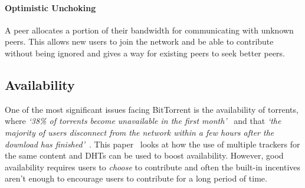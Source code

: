 \paragraph*{Optimistic Unchoking}
A peer allocates a portion of their bandwidth for communicating with unknown peers. This allows new users to join the network and be able to contribute without being ignored and gives a way for existing peers to seek better peers.

\subsection*{Availability}\label{subsec:availability}

One of the most significant issues facing BitTorrent is the availability of torrents, where \textit{`38\% of torrents become unavailable in the first month'}~\cite{kaune_unraveling_2010} and that \textit{`the majority of users disconnect from the network within a few hours after the download has finished'}~\cite{pouwelse_bittorrent_2005}.
This paper~\cite{neglia_availability_2007} looks at how the use of multiple trackers for the same content and DHTs can be used to boost availability. 
However, good availability requires users to \textit{choose} to contribute and often the built-in incentives aren't enough to encourage users to contribute for a long period of time.
